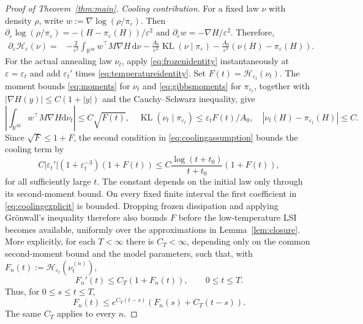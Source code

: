 \documentclass[10pt,a4paper]{amsart}
\newcommand{\KL}{\operatorname{KL}}
\newcommand{\R}{\mathbb R}
\newcommand{\cH}{\mathcal H}
\newcommand{\dd}{\mathrm d}
\newcommand{\eps}{\varepsilon}
\theoremstyle{plain}
\theoremstyle{definition}
\begin{document}
\begin{proof}[Proof of Theorem~\ref{thm:main}]
\emph{Cooling contribution.}
For a fixed law $\nu$ with density $\rho$, write
$w:=\nabla\log(\rho/\pi_\eps)$. Then
$\partial_\eps\log(\rho/\pi_\eps)=-(H-\pi_\eps(H))/\eps^2$ and
$\partial_\eps w=-\nabla H/\eps^2$. Therefore,
\begin{align}\label{eq:temperatureidentity}
 \partial_\eps\cH_\eps(\nu)
 ={}&-\frac{2}{\eps^2}\int_{\R^{3d}} w^\top M\nabla H\,\dd\nu
 -\frac{A_0}{\eps^2}\KL(\nu\mid\pi_\eps)
 -\frac{A_0}{\eps^3}\left(\nu(H)-\pi_\eps(H)\right).
\end{align}
For the actual annealing law $\nu_t$, apply \eqref{eq:frozenidentity}
instantaneously at $\eps=\eps_t$ and add $\eps_t'$ times
\eqref{eq:temperatureidentity}. Set $F(t)=\cH_{\eps_t}(\nu_t)$. The moment
bounds \eqref{eq:moments} for $\nu_t$ and \eqref{eq:gibbsmoments} for
$\pi_{\eps_t}$, together with $|\nabla H(y)|\leq C(1+|y|)$ and the
Cauchy--Schwarz inequality, give
\[
 \left|\int_{\R^{3d}} w^\top M\nabla H\dd\nu_t\right|\leq C\sqrt{F(t)},
 \quad \KL(\nu_t\mid\pi_{\eps_t})\leq\eps_t F(t)/A_0,
 \quad |\nu_t(H)-\pi_{\eps_t}(H)|\leq C.
\]
Since $\sqrt F\leq1+F$, the second condition in
\eqref{eq:coolingassumption} bounds the cooling term by
\begin{equation}\label{eq:coolingexplicit}
 C|\eps_t'|\left(1+\eps_t^{-3}\right)(1+F(t))
 \leq C\frac{\log(t+t_0)}{t+t_0}(1+F(t)),
\end{equation}
for all sufficiently large $t$. The constant depends on the initial law
only through its second-moment bound. On every fixed finite interval the
first coefficient in \eqref{eq:coolingexplicit} is bounded. Dropping frozen
dissipation and applying Gr\"{o}nwall's inequality therefore also bounds $F$ before the
low-temperature LSI becomes available, uniformly over the approximations
in Lemma~\ref{lem:closure}.
More explicitly, for each $T<\infty$ there is $C_T<\infty$, depending only
on the common second-moment bound and the model parameters, such that, with
$F_n(t):=\cH_{\eps_t}\left(\nu_t^{(n)}\right)$,
\[
 F_n'(t)\leq C_T(1+F_n(t)),\qquad 0\leq t\leq T.
\]
Thus, for $0\leq s\leq t\leq T$,
\[
 F_n(t)
 \leq e^{C_T(t-s)}\left(F_n(s)+C_T(t-s)\right).
\]
The same $C_T$ applies to every $n$.


\end{proof}
\end{document}
